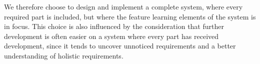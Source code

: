 
We therefore choose to design and implement a complete system, where every required part is included, but where the feature learning elements of the system is in focus. This choice is also influenced by the consideration that further development is often easier on a system where every part has received development, since it tends to uncover unnoticed requirements and a better understanding of holistic requirements.
